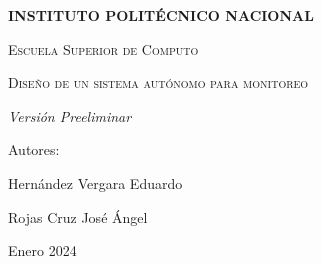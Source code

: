 \begin{titlepage}
\begin{figure}[ht!]
\begin{minipage}{0.2\textwidth}
        \end{minipage}
    \end{figure}
    \centering
    \vspace{1cm}
    {\bfseries\LARGE INSTITUTO POLIT\'ECNICO NACIONAL \par}
    \vspace{1cm}
    {\scshape\Large Escuela Superior de Computo \par}
    \vspace{3cm}
    {\scshape\Huge Dise\~no de un sistema aut\'onomo para monitoreo \par}
    \vspace{3cm}
    {\itshape\Large Versi\'on Preeliminar \par}
    \vfill
    {\Large Autores: \par}
    {\Large Hern\'andez Vergara Eduardo \par}
    {\Large Rojas Cruz Jos\'e \'Angel \par}
    \vfill
    {\Large Enero 2024 \par}
\end{titlepage}